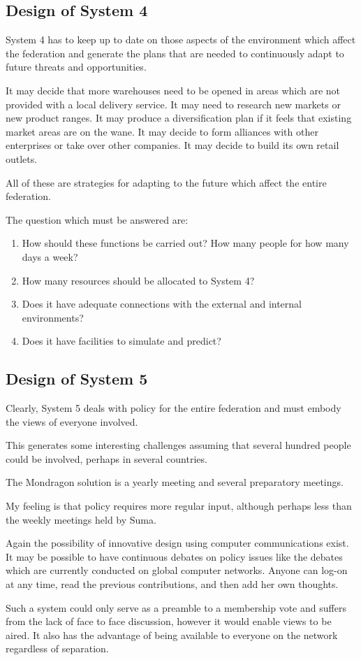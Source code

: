 \subsection*{Design of System 4}
System 4 has to keep up to date on those aspects of the environment which affect the federation and generate the plans that are needed to continuously adapt to future threats and opportunities.

It may decide that more warehouses need to be opened in areas which are not provided with a local delivery service. It may need to research new markets or new product ranges. It may produce a diversification plan if it feels that existing market areas are on the wane. It may decide to form alliances with other enterprises or take over other companies. It may decide to build its own retail outlets.

All of these are strategies for adapting to the future which affect the entire federation.

The question which must be answered are:

\begin{enumerate}
  \item How should these functions be carried out? How many people for how many days a week?

  \item How many resources should be allocated to System 4?

  \item Does it have adequate connections with the external and internal environments?

  \item Does it have facilities to simulate and predict?

\end{enumerate}

\subsection*{Design of System 5}
Clearly, System 5 deals with policy for the entire federation and must embody the views of everyone involved.

This generates some interesting challenges assuming that several hundred people could be involved, perhaps in several countries.

The Mondragon solution is a yearly meeting and several preparatory meetings.

My feeling is that policy requires more regular input, although perhaps less than the weekly meetings held by Suma.

Again the possibility of innovative design using computer communications exist. It may be possible to have continuous debates on policy issues like the debates which are currently conducted on global computer networks. Anyone can log-on at any time, read the previous contributions, and then add her own thoughts.

Such a system could only serve as a preamble to a membership vote and suffers from the lack of face to face discussion, however it would enable views to be aired. It also has the advantage of being available to everyone on the network regardless of separation.